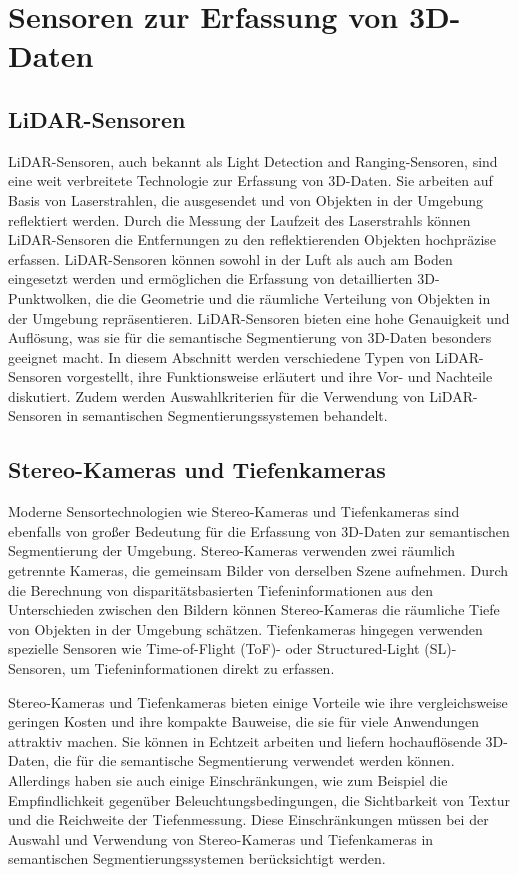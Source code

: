 \chapter{Sensoren zur Erfassung von 3D-Daten}

\section{LiDAR-Sensoren}
LiDAR-Sensoren, auch bekannt als Light Detection and Ranging-Sensoren, sind
eine weit verbreitete Technologie zur Erfassung von 3D-Daten. Sie arbeiten auf
Basis von Laserstrahlen, die ausgesendet und von Objekten in der Umgebung
reflektiert werden. Durch die Messung der Laufzeit des Laserstrahls können
LiDAR-Sensoren die Entfernungen zu den reflektierenden Objekten hochpräzise
erfassen. LiDAR-Sensoren können sowohl in der Luft als auch am Boden eingesetzt
werden und ermöglichen die Erfassung von detaillierten 3D-Punktwolken, die die
Geometrie und die räumliche Verteilung von Objekten in der Umgebung
repräsentieren. LiDAR-Sensoren bieten eine hohe Genauigkeit und Auflösung, was
sie für die semantische Segmentierung von 3D-Daten besonders geeignet macht. In
diesem Abschnitt werden verschiedene Typen von LiDAR-Sensoren vorgestellt, ihre
Funktionsweise erläutert und ihre Vor- und Nachteile diskutiert. Zudem werden
Auswahlkriterien für die Verwendung von LiDAR-Sensoren in semantischen
Segmentierungssystemen behandelt.

\section{Stereo-Kameras und Tiefenkameras}
Moderne Sensortechnologien wie Stereo-Kameras und Tiefenkameras sind ebenfalls
von großer Bedeutung für die Erfassung von 3D-Daten zur semantischen
Segmentierung der Umgebung. Stereo-Kameras verwenden zwei räumlich getrennte
Kameras, die gemeinsam Bilder von derselben Szene aufnehmen. Durch die
Berechnung von disparitätsbasierten Tiefeninformationen aus den Unterschieden
zwischen den Bildern können Stereo-Kameras die räumliche Tiefe von Objekten in
der Umgebung schätzen. Tiefenkameras hingegen verwenden spezielle Sensoren wie
Time-of-Flight (ToF)- oder Structured-Light (SL)-Sensoren, um
Tiefeninformationen direkt zu erfassen.

Stereo-Kameras und Tiefenkameras bieten einige Vorteile wie ihre
vergleichsweise geringen Kosten und ihre kompakte Bauweise, die sie für viele
Anwendungen attraktiv machen. Sie können in Echtzeit arbeiten und liefern
hochauflösende 3D-Daten, die für die semantische Segmentierung verwendet werden
können. Allerdings haben sie auch einige Einschränkungen, wie zum Beispiel die
Empfindlichkeit gegenüber Beleuchtungsbedingungen, die Sichtbarkeit von Textur
und die Reichweite der Tiefenmessung. Diese Einschränkungen müssen bei der
Auswahl und Verwendung von Stereo-Kameras und Tiefenkameras in semantischen
Segmentierungssystemen berücksichtigt werden.

